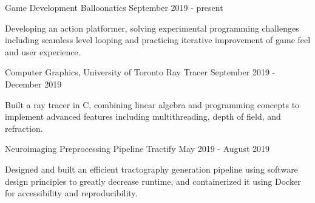 

\begin{cventries}

  \cventry
    {Game Development} %
    {Balloonatics} %
    {} %
    {September 2019 - present} %
    {
      \begin{cvitems} %
        \item {Developing an action platformer, solving experimental programming challenges including seamless level looping and practicing iterative improvement of game feel and user experience.}
      \end{cvitems}
    }

  \cventry
    {Computer Graphics, University of Toronto} %
    {Ray Tracer} %
    {} %
    {September 2019 - December 2019} %
    {
      \begin{cvitems} %
        \item {Built a ray tracer in C, combining linear algebra and programming concepts to implement advanced features including multithreading, depth of field, and refraction.}
      \end{cvitems}
    }

  \cventry
    {Neuroimaging Preprocessing Pipeline} %
    {Tractify} %
    {} %
    {May 2019 - August 2019} %
    {
      \begin{cvitems} %
        \item {Designed and built an efficient tractography generation pipeline using software design principles to greatly decrease runtime, and containerized it using Docker for accessibility and reproducibility.}
      \end{cvitems}
    }

\end{cventries}
